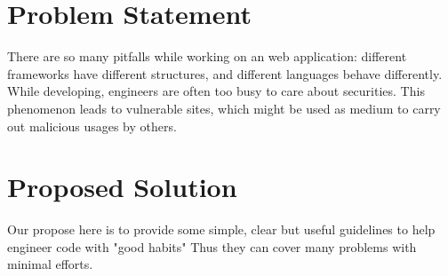 \documentclass[12pt, a4paper]{article}
\begin{document}
%
%
\section{Problem Statement}
There are so many pitfalls while working on an web application:
different frameworks have different structures, and different languages behave
differently.
While developing,
engineers are often too busy to care about securities.
This phenomenon leads to vulnerable sites,
which might be used as medium to carry out malicious usages by others.

\section{Proposed Solution}
Our propose here is to provide some simple, clear but useful guidelines
to help engineer code with "good habits"
Thus they can cover many problems with minimal efforts.

%
\end{document}
